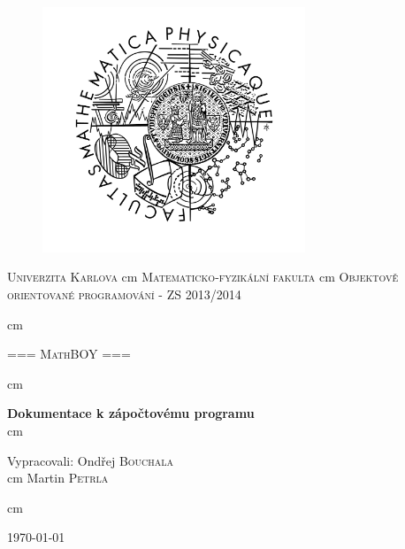 \documentclass[a4paper,12pt,final]{article}
\begin{document}


\begin{titlepage}

\begin{figure}[ht]
	\centering
		\includegraphics[width=0.70\textwidth]{mfflogo.jpg}
	\label{fig:mfflogo}
\end{figure}

\center %

\textsc{\LARGE Univerzita Karlova} %
 cm
\textsc{\LARGE Matematicko-fyzikální fakulta}
 cm
\textsc{\Large Objektově orientované programování - ZS 2013/2014}

 cm

\textsc{\Huge === MathBOY ===}

 cm

{ \LARGE \bfseries Dokumentace k zápočtovému programu}\\ %

 cm

\begin{flushleft} \large Vypracovali: Ondřej \textsc{Bouchala}\\
 cm Martin \textsc{Petrla} %

 cm

\large \today\\ %
\end{flushleft}

\vfill %

\end{titlepage}
\end{document}
